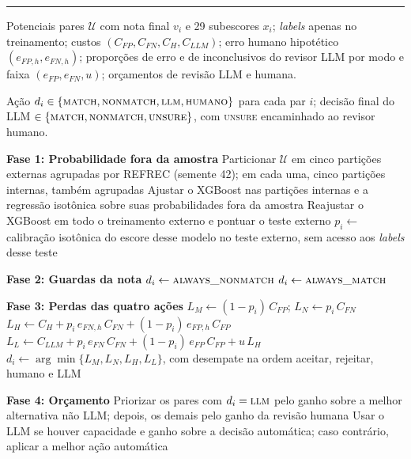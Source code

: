 \noindent\rule{\textwidth}{0.4pt}
\begin{algorithmic}[1]

\REQUIRE \parbox[t]{0.85\linewidth}{Potenciais pares $\mathcal{U}$ com nota final $v_i$ e 29 subescores $x_i$; \textit{labels} apenas no treinamento;
  custos $(C_{FP}, C_{FN}, C_H, C_{LLM})$; erro humano hipotético $(e_{FP,h}, e_{FN,h})$;
  proporções de erro e de inconclusivos do revisor LLM por modo e faixa $(e_{FP}, e_{FN}, u)$; orçamentos de revisão LLM e humana.}
\ENSURE \parbox[t]{0.85\linewidth}{Ação $d_i \in \{\textsc{match}, \textsc{nonmatch}, \textsc{llm}, \textsc{humano}\}$ para cada par $i$;
  decisão final do LLM $\in \{\textsc{match}, \textsc{nonmatch}, \textsc{unsure}\}$, com \textsc{unsure} encaminhado ao revisor humano.}

\medskip
\STATE \textbf{Fase 1: Probabilidade fora da amostra}
\STATE Particionar $\mathcal{U}$ em cinco partições externas agrupadas por REFREC (semente 42); em cada uma, cinco partições internas, também agrupadas
\STATE Ajustar o XGBoost nas partições internas e a regressão isotônica sobre suas probabilidades fora da amostra
\STATE Reajustar o XGBoost em todo o treinamento externo e pontuar o teste externo
\STATE $p_i \leftarrow$ calibração isotônica do escore desse modelo no teste externo, sem acesso aos \textit{labels} desse teste

\medskip
\STATE \textbf{Fase 2: Guardas da nota}
        \STATE $d_i \leftarrow \textsc{always\_nonmatch}$
        \STATE $d_i \leftarrow \textsc{always\_match}$
    \ENDIF
\ENDFOR

\medskip
\STATE \textbf{Fase 3: Perdas das quatro ações}
    \STATE $L_M \leftarrow (1-p_i)\,C_{FP}$; \quad $L_N \leftarrow p_i\,C_{FN}$
    \STATE $L_H \leftarrow C_H + p_i\,e_{FN,h}\,C_{FN} + (1-p_i)\,e_{FP,h}\,C_{FP}$
    \STATE $L_L \leftarrow C_{LLM} + p_i\,e_{FN}\,C_{FN} + (1-p_i)\,e_{FP}\,C_{FP} + u\,L_H$
    \STATE $d_i \leftarrow \arg\min\{L_M, L_N, L_H, L_L\}$, com desempate na ordem aceitar, rejeitar, humano e LLM
\ENDFOR

\medskip
\STATE \textbf{Fase 4: Orçamento}
\STATE Priorizar os pares com $d_i = \textsc{llm}$ pelo ganho sobre a melhor alternativa não LLM; depois, os demais pelo ganho da revisão humana
    \STATE Usar o LLM se houver capacidade e ganho sobre a decisão automática; caso contrário, aplicar a melhor ação automática
\ENDIF


\end{algorithmic}
